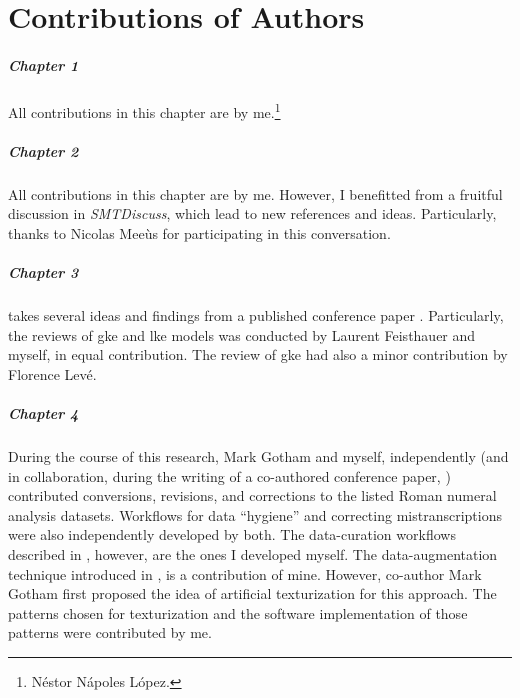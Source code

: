 \chapter*{Contributions of Authors}
\label{chap:contributionsofauthors}

\paragraph{Chapter 1}
All contributions in this chapter are by
me.\footnote{N\'estor N\'apoles L\'opez.}

\paragraph{Chapter 2}
All contributions in this chapter are by me. However, I
benefitted from a fruitful discussion in
\emph{SMTDiscuss},
which lead to new references and ideas. Particularly, thanks
to Nicolas Mee\`us for participating in this conversation.

\paragraph{Chapter 3} 
 takes several ideas and findings
from a published conference paper
\parencite{napoleslopez2020local}. Particularly, the reviews
of \gls{gke} and \gls{lke} models was conducted by Laurent
Feisthauer and myself, in equal contribution. The review of
\gls{gke} had also a minor contribution by Florence Lev\'e.

\paragraph{Chapter 4} 
During the course of this research, Mark Gotham and myself,
independently (and in collaboration, during the writing of a
co-authored conference paper,
\cite{napoleslopez2021augmentednet}) contributed
conversions, revisions, and corrections to the listed Roman
numeral analysis datasets. Workflows for data ``hygiene''
and correcting mistranscriptions were also independently
developed by both. The data-curation workflows described in
, however, are the ones
I developed myself. The data-augmentation technique
introduced in
, is a
contribution of mine. However, co-author Mark Gotham first
proposed the idea of artificial texturization for this
approach. The patterns chosen for texturization and the
software implementation of those patterns were contributed
by me.

